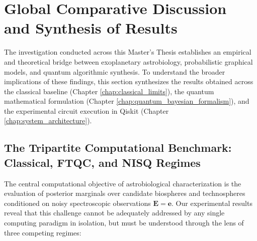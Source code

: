 \section{Global Comparative Discussion and Synthesis of Results}\label{sec:comparative_discussion}

The investigation conducted across this Master's Thesis establishes an empirical and theoretical bridge between exoplanetary astrobiology, probabilistic graphical models, and quantum algorithmic synthesis. To understand the broader implications of these findings, this section synthesizes the results obtained across the classical baseline (Chapter \ref{chap:classical_limits}), the quantum mathematical formulation (Chapter \ref{chap:quantum_bayesian_formalism}), and the experimental circuit execution in Qiskit (Chapter \ref{chap:system_architecture}).

\subsection{The Tripartite Computational Benchmark: Classical, FTQC, and NISQ Regimes}

The central computational objective of astrobiological characterization is the evaluation of posterior marginals over candidate biospheres and technospheres conditioned on noisy spectroscopic observations $\mathbf{E} = \mathbf{e}$. Our experimental results reveal that this challenge cannot be adequately addressed by any single computing paradigm in isolation, but must be understood through the lens of three competing regimes:

